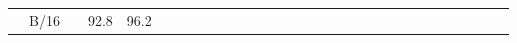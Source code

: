 \documentclass{article}
\begin{document}
\begin{table*}[]
\begin{tabular}{cc|cccccccccccccccccccccccccccc}
        \\
        &B/16& \hspace{-1.2em} & \hspace{-0.9em}92.8\hspace{-0.4em} & \hspace{-0.9em}96.2\hspace{-0
\end{tabular}
\end{table*}
\end{document}
